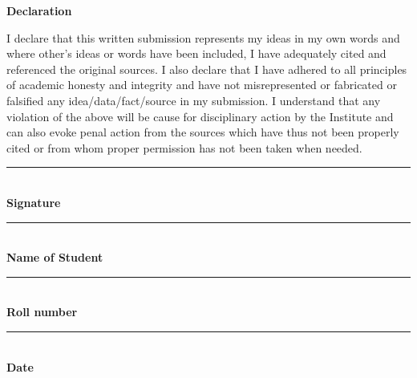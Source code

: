 \documentclass[a4paper,11pt]{report}
\begin{document}
\setcounter{page}{2}

\begin{center}
\textbf{\Large Declaration}                
\end{center}

I declare that this written submission represents my ideas in my own words and where
other's ideas or words have been included, I have adequately cited and referenced the original
sources.  I also declare that I have adhered to all principles of academic honesty and integrity
and   have   not   misrepresented   or   fabricated   or   falsified   any   idea/data/fact/source   in   my
submission.  I understand that any violation of the above will be cause for disciplinary action
by the Institute and can also evoke  penal action from the sources which have thus not been
properly cited or from whom proper permission has not been taken when needed.\\


 \begin{flushright}

\begin{minipage}{180pt}
    \begin{flushright}
    \hspace{150pt} \rule{180pt}{1pt} \\
    \textbf{Signature\\}
    \hspace{150pt} \rule{180pt}{1pt} \\
    \textbf{Name of Student\\}
     \hspace{150pt} \rule{180pt}{1pt} \\
    \textbf{Roll number\\}
      \hspace{150pt} \rule{180pt}{1pt} \\
    \textbf{Date}
    \end{flushright}
\end{minipage}
\end{flushright}


\def\bsq{\begin{flushright} $\blacksquare$\\ \end{flushright}}
\newpage
\end{document}
